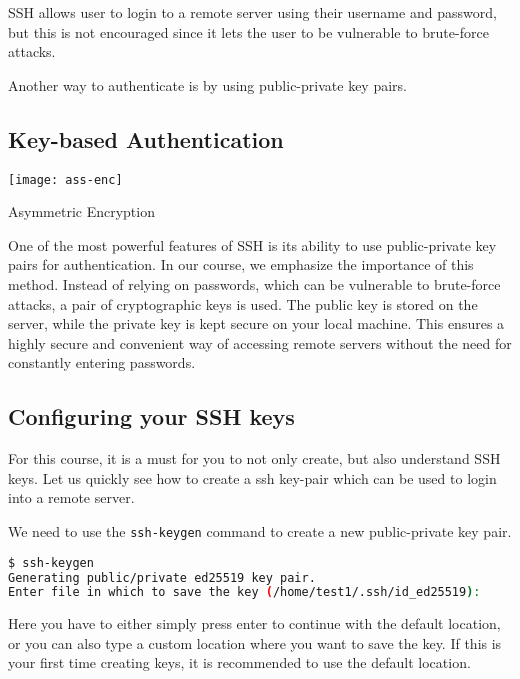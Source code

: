 SSH allows user to login to a remote server using
their username and password, but this is not encouraged
since it lets the user to be vulnerable to brute-force
attacks.

Another way to authenticate is by using public-private
key pairs.

\subsection{Key-based Authentication}

\begin{marginfigure}
  \texttt{[image: ass-enc]}
  \caption{Asymmetric Encryption}
\end{marginfigure}

One of the most powerful features of SSH is its ability
to use public-private key pairs for authentication. In
our course, we emphasize the importance of this method.
Instead of relying on passwords, which can be vulnerable
to brute-force attacks, a pair of cryptographic keys is used.
The public key is stored on the server, while the private key
is kept secure on your local machine. This ensures a highly
secure and convenient way of accessing remote servers without
the need for constantly entering passwords.

\subsection{Configuring your SSH keys}

For this course, it is a must for you to not only
create, but also understand SSH keys.
Let us quickly see how to create a ssh key-pair
which can be used to login into a remote server.

We need to use the \texttt{ssh-keygen}
command to create a new public-private
key pair.

\begin{lstlisting}[language=bash]
$ ssh-keygen
Generating public/private ed25519 key pair.
Enter file in which to save the key (/home/test1/.ssh/id_ed25519):
\end{lstlisting}

Here you have to either simply press enter to
continue with the default location, or you can
also type a custom location where you want to
save the key. If this is your first time creating
keys, it is recommended to use the default location.

